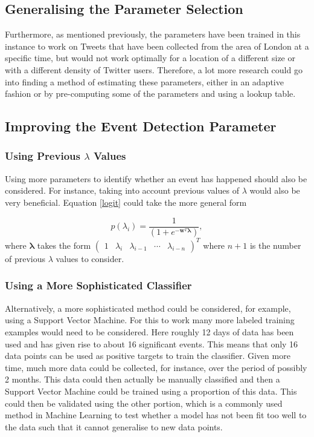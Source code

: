 \documentclass[11pt,a4paper]{article}
\begin{document}
\subsection{Generalising the Parameter Selection}
Furthermore, as mentioned previously, the parameters have been trained in this instance to work on Tweets that have been collected from the area of London at a specific time, but would not work optimally for a location of a different size or with a different density of Twitter users. Therefore, a lot more research could go into finding a method of estimating these parameters, either in an adaptive fashion or by pre-computing some of the parameters and using a lookup table.

\subsection{Improving the Event Detection Parameter}
\subsubsection{Using Previous $\lambda$ Values}
Using more parameters to identify whether an event has happened should also be considered. For instance, taking into account previous values of $\lambda$ would also be very beneficial. Equation \eqref{logit} could take the more general form

\begin{equation}
p(\lambda_i)= \frac{1}{\left( 1 + e^{-\mathbf{w}^T\bm{\lambda}}\right)},
\label{logit_general}
\end{equation}
where $\bm{\lambda}$ takes the form $\left(\begin{matrix}
1 & \lambda_i & \lambda_{i-1} & \cdots & \lambda_{i-n}
\end{matrix}\right)^T$ where $n+1$ is the number of previous $\lambda$ values to consider. 

\subsubsection{Using a More Sophisticated Classifier}
Alternatively, a more sophisticated method could be considered, for example, using a Support Vector Machine. For this to work many more labeled training examples would need to be considered. Here roughly 12 days of data has been used and has given rise to about 16 significant events. This means that only 16 data points can be used as positive targets to train the classifier. Given more time, much more data could be collected, for instance, over the period of possibly 2 months. This data could then actually be manually classified and then a Support Vector Machine could be trained using a proportion of this data. This could then be validated using the other portion, which is a commonly used method in Machine Learning to test whether a model has not been fit too well to the data such that it cannot generalise to new data points.
\end{document}
